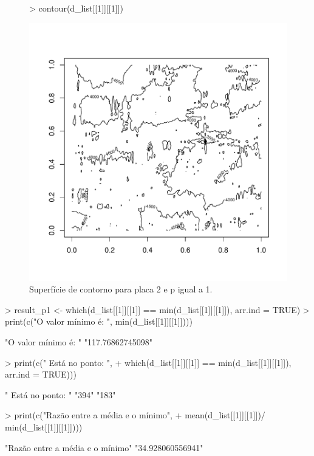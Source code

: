 \documentclass[12pt]{article}
\begin{document}
\begin{figure}
\centering
\begin{Schunk}
\begin{Sinput}
> contour(d_list[[1]][[1]])
\end{Sinput}
\end{Schunk}
\includegraphics{template_matching-017}
\caption{Superfície de contorno para placa 2 e p igual a 1.}
\label{placa1p1}
\end{figure}

\begin{Schunk}
\begin{Sinput}
> result_p1 <- which(d_list[[1]][[1]] == min(d_list[[1]][[1]]), arr.ind = TRUE)
> print(c("O valor mínimo é: ",  min(d_list[[1]][[1]])))
\end{Sinput}
\begin{Soutput}
[1] "O valor mínimo é: " "117.76862745098"   
\end{Soutput}
\begin{Sinput}
> print(c(" Está no ponto: ",
+         which(d_list[[1]][[1]] == min(d_list[[1]][[1]]), arr.ind = TRUE)))
\end{Sinput}
\begin{Soutput}
[1] " Está no ponto: " "394"              "183"             
\end{Soutput}
\begin{Sinput}
> print(c("Razão entre a média e o mínimo", 
+         mean(d_list[[1]][[1]])/ min(d_list[[1]][[1]])))
\end{Sinput}
\begin{Soutput}
[1] "Razão entre a média e o mínimo" "34.928060556941"               
\end{Soutput}
\end{Schunk}
\end{document}
